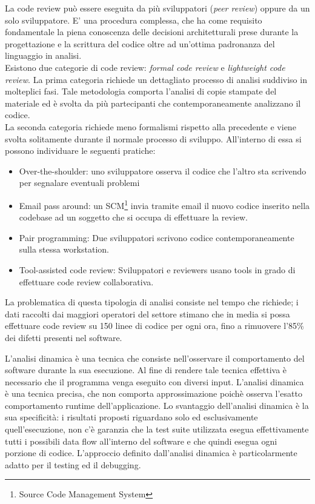 La code review può essere eseguita da più sviluppatori (\emph{peer review}) oppure da un solo sviluppatore. E' una procedura complessa, che ha come requisito fondamentale la piena conoscenza delle decisioni architetturali prese durante la progettazione e la scrittura del codice oltre ad un'ottima padronanza del linguaggio in analisi. \\
Esistono due categorie di code review: \emph{formal code review} e \emph{lightweight code review}. La prima categoria richiede un dettagliato processo di analisi suddiviso in molteplici fasi. Tale metodologia comporta l'analisi di copie stampate del materiale ed è svolta da più partecipanti che contemporaneamente analizzano il codice.\\
La seconda categoria richiede meno formalismi rispetto alla precedente e viene svolta solitamente durante il normale processo di sviluppo. All'interno di essa si possono individuare le seguenti pratiche:
\begin{itemize}
\item Over-the-shoulder: uno sviluppatore osserva il codice che l'altro sta scrivendo per segnalare eventuali problemi
\item Email pass around: un SCM\footnote{Source Code Management System} invia tramite email il nuovo codice inserito nella codebase ad un soggetto che si occupa di effettuare la review.
\item Pair programming: Due sviluppatori scrivono codice contemporaneamente sulla stessa workstation. 
\item Tool-assisted code review: Sviluppatori e reviewers usano tools in grado di effettuare code review collaborativa.
\end{itemize}
La problematica di questa tipologia di analisi consiste nel tempo che richiede; i dati raccolti dai maggiori operatori del settore stimano che in media si possa effettuare code review su 150 linee di codice per ogni ora, fino a rimuovere l'85\% dei difetti presenti nel software.

L'analisi dinamica è una tecnica che consiste nell'osservare il comportamento del software durante la sua esecuzione. Al fine di rendere tale tecnica effettiva è necessario che il programma venga eseguito con diversi input. L'analisi dinamica è una tecnica precisa, che non comporta approssimazione poichè osserva l'esatto comportamento runtime dell'applicazione.
Lo svantaggio dell'analisi dinamica è la sua specificità: i risultati proposti riguardano solo ed esclusivamente quell'esecuzione, non c'è garanzia che la test suite utilizzata esegua effettivamente tutti i possibili data flow all'interno del software e che quindi esegua ogni porzione di codice. L'approccio definito dall'analisi dinamica è particolarmente adatto per il testing ed il debugging.

